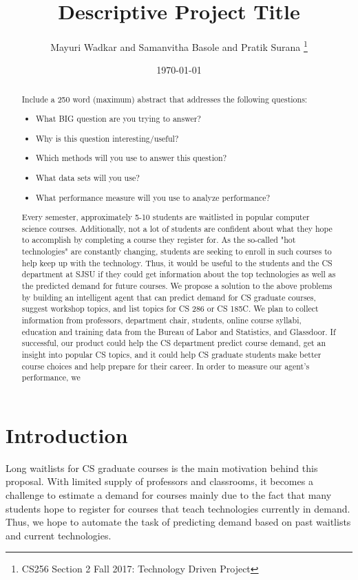 \documentclass{article}
\title{Descriptive Project Title}
\author{Mayuri Wadkar and Samanvitha Basole and Pratik Surana
\thanks{CS256 Section 2 Fall 2017: Technology Driven Project}}
\date{\today}
\begin{document}
\maketitle

\begin{abstract}
Include a 250 word (maximum) abstract that addresses the following questions:
\begin{itemize}
\item What BIG question are you trying to answer?
\item Why is this question interesting/useful?
\item Which methods will you use to answer this question?
\item What data sets will you use?
\item What performance measure will you use to analyze performance?
\end{itemize}
Every semester, approximately 5-10 students are waitlisted in popular computer science courses. 
Additionally, not a lot of students are confident about what they hope to accomplish by completing a course they register for. As the so-called "hot technologies" are constantly changing, students are seeking to enroll in such courses to help keep up with the technology. Thus, it would be useful to the students and the CS department at SJSU if they could get information about the top technologies as well as the predicted demand for future courses. We propose a solution to the above problems by building an intelligent agent that can predict demand for CS graduate courses, suggest workshop topics, and list topics for CS 286 or CS 185C. We plan to collect information from professors, department chair, students, online course syllabi, education and training data from the Bureau of Labor and Statistics, and Glassdoor. If successful, our product could help the CS department predict course demand, get an insight into popular CS topics, and it could help CS graduate students make better course choices and help prepare for their career. In order to measure our agent's performance, we 
\end{abstract}

\section{Introduction}

Long waitlists for CS graduate courses is the main motivation behind this proposal. With limited supply of professors and classrooms, it becomes a challenge to estimate a demand for courses mainly due to the fact that many students hope to register for courses that teach technologies currently in demand. Thus, we hope to automate the task of predicting demand based on past waitlists and current technologies. 
\end{document}
